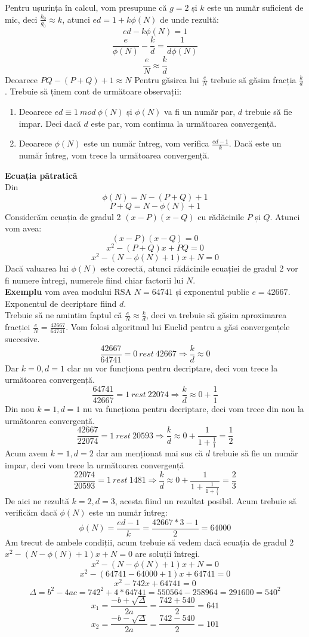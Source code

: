 \documentclass[12]{report}
\begin{document}
Pentru ușurința în calcul, vom presupune că $g=2$ și $k$ este un număr suficient de mic, deci $\frac{k_0}{g_0} \approx k$, atunci $ed = 1+k\phi(N)$ de unde rezultă:
$$ ed-k\phi(N)=1$$
$$ \frac{e}{\phi(N)} - \frac{k}{d} = \frac{1}{d\phi(N)}$$
$$ \frac{e}{N} \approx \frac{k}{d} $$ 
Deoarece $PQ - (P+Q)+1 \approx N$
Pentru găsirea lui $\frac{e}{N}$ trebuie să găsim fracția $\frac{k}{d}$. Trebuie să ținem cont de următoare observații:
\begin{enumerate}
\item Deoarece $ed \equiv 1 \ mod \ \phi(N)$ și $\phi(N)$ va fi un număr par, $d$ trebuie să fie impar. Deci dacă $d$ este par, vom continua la următoarea convergență.

\item Deoarece $\phi(N)$ este un număr întreg, vom verifica  $\frac{ed -1}{k}$. Dacă este un număr întreg, vom trece la următoarea convergență.

\end{enumerate}
\textbf{Ecuația pătratică} \\
Din
$$ \phi(N)=N-(P+Q)+1$$
$$ P+Q = N - \phi(N) +1$$
Considerăm ecuația de gradul 2 $(x-P)(x-Q)$ cu rădăcinile $P$ și $Q$. Atunci vom avea:
$$(x-P)(x-Q)=0$$
$$x^2 - (P+Q)x + PQ = 0$$
$$x^2 - (N- \phi(N)+1)x + N =0$$
Dacă valuarea lui $\phi(N)$ este corectă, atunci rădăcinile ecuației de gradul 2 vor fi numere întregi, numerele fiind chiar factorii lui $N$. \\

\textbf{Exemplu} vom avea modului RSA $N=64741$ și exponentul public $e=42667$. Exponentul de decriptare fiind $d$.\\
Trebuie să ne amintim faptul că $ \frac{e}{N} \approx \frac{k}{d}$, deci va trebuie să găsim aproximarea fracției $\frac{e}{N} = \frac{42667}{64741}$. Vom folosi algoritmul lui Euclid pentru a găsi convergențele succesive. \\
$$\frac{42667}{64741}= 0 \ rest \ 42667 \Rightarrow \frac{k}{d} \approx 0 $$
Dar $k=0, d=1$ clar nu vor funcționa pentru decriptare, deci vom trece la următoarea convergență.
$$ \frac{64741}{42667} = 1 \ rest \ 22074 \Rightarrow \frac{k}{d} \approx 0 + \frac{1}{1}$$
Din nou $k=1,d=1$ nu va funcționa pentru decriptare, deci vom trece din nou la următoarea convergență.
$$ \frac{42667}{22074} = 1 \ rest \ 20593 \Rightarrow \frac{k}{d} \approx 0 + \frac{1}{1+\frac{1}{1}} = \frac{1}{2}$$ 
Acum avem $k=1,d=2$ dar am menționat mai sus că $d$ trebuie să fie un număr impar, deci vom trece la următoarea convergență
$$ \frac{22074}{20593} = 1 \ rest \ 1481 \Rightarrow \frac{k}{d} \approx 0 + \frac{1}{1 + \frac{1}{1+\frac{1}{1}}} = \frac{2}{3} $$ 
De aici ne rezultă $k=2,d=3$, acesta fiind un rezultat posibil. Acum trebuie să verificăm dacă $\phi(N)$ este un număr întreg:
$$\phi(N)=\frac{ed-1}{k}=\frac{42667 * 3 -1}{2}=64000$$
Am trecut de ambele condiții, acum trebuie să vedem dacă ecuația de gradul 2 $x^2 - (N- \phi(N) +1)x +N=0$ are soluții întregi.
$$x^2 - (N- \phi(N)+1)x+N=0$$
$$x^2 - (64741 - 64000 +1)x + 64741=0$$
$$x^2 - 742x + 64741=0$$
$$ \Delta = b^2 - 4ac = 742^2 + 4*64741 = 550564 - 258964 = 291600 = 540^{2} $$
$$x_1 = \frac{-b + \sqrt{\Delta}}{2a} = \frac{742 + 540}{2} = 641$$ 
$$x_2 = \frac{-b - \sqrt{\Delta}}{2a} = \frac{742 - 540}{2} = 101$$
\end{document}
